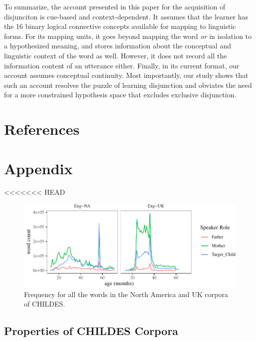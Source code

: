\documentclass[,man,floatsintext]{apa6}
\begin{document}
To summarize, the account presented in this paper for the acquisition of disjunciton is cue-based and context-dependent. It assumes that the learner has the 16 binary logical connective concepts available for mapping to linguistic forms. For its mapping units, it goes beyond mapping the word \emph{or} in isolation to a hypothesized meaning, and stores information about the conceptual and linguistic context of the word as well. However, it does not record all the information content of an utterance either. Finally, in its current format, our account assumes conceptual continuity. Most importantly, our study shows that such an account resolves the puzzle of learning disjunction and obviates the need for a more constrained hypothesis space that excludes exclusive disjunction.

\newpage

\hypertarget{references}{%
\section{References}\label{references}}

\hypertarget{appendix}{%
\section{Appendix}\label{appendix}}

<<<<<<< HEAD
\begin{figure}[tb]

{\centering \includegraphics{figs/corpusDensityPlot-1} 

}

\caption{Frequency for all the words in the North America and UK corpora of CHILDES.}\label{fig:corpusDensityPlot}
\end{figure}

\hypertarget{properties-of-childes-corpora}{%
\subsection{Properties of CHILDES Corpora}\label{properties-of-childes-corpora}}
\end{document}
